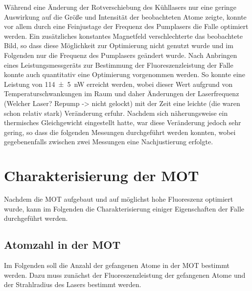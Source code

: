 \documentclass[11pt, a4paper]{article}
\numberwithin{equation}{section}
\newcommand{\korr}[1]{{\color{red}(#1)}}
\begin{document}
Während eine Änderung der Rotverschiebung des Kühllasers nur eine geringe Auswirkung auf die Größe und Intensität der beobachteten Atome zeigte, konnte vor allem durch eine Feinjustage der Frequenz des Pumplasers die Falle optimiert werden.
Ein zusätzliches konstantes Magnetfeld verschlechterte das beobachtete Bild, so dass diese Möglichkeit zur Optimierung nicht genutzt wurde und im Folgenden nur die Frequenz des Pumplasers geändert wurde.
Nach Anbringen eines Leistungsmessgeräts zur Bestimmung der Fluoreszenzleistung der Falle konnte auch quantitativ eine Optimierung vorgenommen werden.
So konnte eine Leistung von \SI{114 +- 5}{nW} erreicht werden, wobei dieser Wert aufgrund von Temperaturschwankungen im Raum und daher Änderungen der Laserfrequenz \korr{Welcher Laser? Repump -> nicht gelockt} mit der Zeit eine leichte \korr{die waren schon relativ stark} Veränderung erfuhr.
Nachdem sich näherungsweise ein thermisches Gleichgewicht eingestellt hatte, war diese Veränderung jedoch sehr gering, so dass die folgenden Messungen durchgeführt werden konnten, wobei gegebenenfalls zwischen zwei Messungen eine Nachjustierung erfolgte.

\section{Charakterisierung der MOT}
\label{sec:charakterisierung_mot}
Nachdem die MOT aufgebaut und auf möglichst hohe Fluoreszenz optimiert wurde, kann im Folgenden die Charakterisierung einiger Eigenschaften der Falle durchgeführt werden.

\subsection{Atomzahl in der MOT}
Im Folgenden soll die Anzahl der gefangenen Atome in der MOT bestimmt werden.
Dazu muss zunächst der Fluoreszenzleistung der gefangenen Atome und der Strahlradius des Lasers bestimmt werden.
\end{document}
